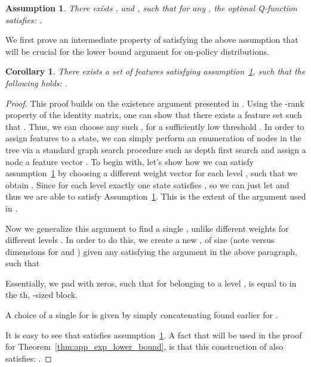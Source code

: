 \documentclass[jmlr]{article}
\newtheorem{assumption}{Assumption}[section]
\newtheorem{corollary}{Corollary}[theorem]
\begin{document}
\begin{assumption}
\label{assumption:optimal_features}
There exists , and , such that for any , the optimal Q-function satisfies: .
\end{assumption}

We first prove an intermediate property of  satisfying the above assumption that will be crucial for the lower bound argument for on-policy distributions.
\begin{corollary}
\label{cor:epsilon_rank_lemma}
There exists a set of features  satisfying assumption~\ref{assumption:optimal_features}, such that the following holds: .
\end{corollary}
\begin{proof}
This proof builds on the existence argument presented in \cite{du2020is}. Using the -rank property of the identity matrix, one can show that there exists a feature set  such that . Thus, we can choose any such , for a sufficiently low threshold . In order to assign features  to a state, we can simply perform an enumeration of nodes in the tree via a standard graph search procedure such as depth first search and assign a node  a feature vector . To begin with, let's show how we can satisfy assumption~\ref{assumption:optimal_features} by choosing a different weight vector  for each level , such that we obtain .
Since for each level  exactly one state satisfies , so we can just let  and thus we are able to satisfy Assumption~\ref{assumption:optimal_features}. This is the extent of the argument used in \cite{du2020is}.

Now we generalize this argument to find a single , unlike different weights  for different levels . In order to do this, we create a new , of size  (note  versus  dimensions for  and ) given any  satisfying the argument in the above paragraph, such that

Essentially, we pad  with zeros, such that for  belonging to a level ,  is equal to  in the th, -sized block.

A choice of a single  for  is given by simply concatenating  found earlier for .

It is easy to see that  satisfies assumption~\ref{assumption:optimal_features}. A fact that will be used in the proof for Theorem~\ref{thm:app_exp_lower_bound}, is that this construction of  also satisfies: .
\end{proof}
\end{document}
